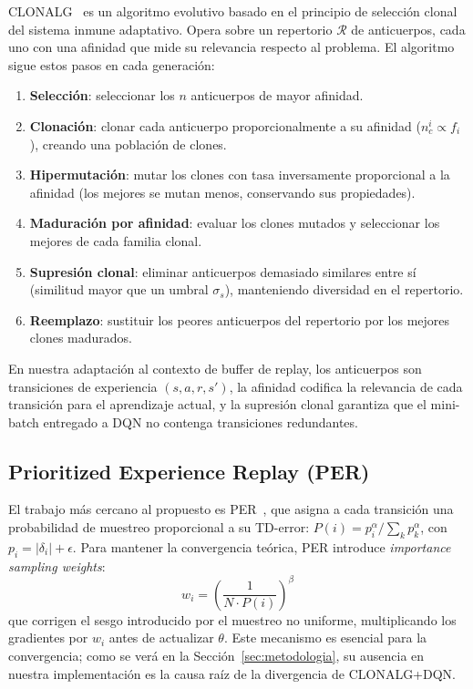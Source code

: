 \documentclass[12pt,a4paper]{article}
\begin{document}
CLONALG~\cite{decastro2002clonalg} es un algoritmo evolutivo basado en el
principio de selección clonal del sistema inmune adaptativo. Opera sobre un
repertorio $\mathcal{R}$ de anticuerpos, cada uno con una afinidad que mide
su relevancia respecto al problema. El algoritmo sigue estos pasos en cada
generación:
 
\begin{enumerate}[noitemsep]
  \item \textbf{Selección}: seleccionar los $n$ anticuerpos de mayor afinidad.
  \item \textbf{Clonación}: clonar cada anticuerpo proporcionalmente a su
        afinidad ($n_c^i \propto f_i$), creando una población de clones.
  \item \textbf{Hipermutación}: mutar los clones con tasa inversamente
        proporcional a la afinidad (los mejores se mutan menos, conservando
        sus propiedades).
  \item \textbf{Maduración por afinidad}: evaluar los clones mutados y
        seleccionar los mejores de cada familia clonal.
  \item \textbf{Supresión clonal}: eliminar anticuerpos demasiado similares
        entre sí (similitud mayor que un umbral $\sigma_s$), manteniendo
        diversidad en el repertorio.
  \item \textbf{Reemplazo}: sustituir los peores anticuerpos del repertorio
        por los mejores clones madurados.
\end{enumerate}
 
En nuestra adaptación al contexto de buffer de replay, los anticuerpos son
transiciones de experiencia $(s, a, r, s')$, la afinidad codifica la
relevancia de cada transición para el aprendizaje actual, y la supresión
clonal garantiza que el mini-batch entregado a DQN no contenga transiciones
redundantes.
 
\subsection{Prioritized Experience Replay (PER)}
 
El trabajo más cercano al propuesto es PER~\cite{schaul2015per}, que asigna
a cada transición una probabilidad de muestreo proporcional a su TD-error:
$P(i) = p_i^\alpha / \sum_k p_k^\alpha$, con $p_i = |\delta_i| + \epsilon$.
Para mantener la convergencia teórica, PER introduce
\textit{importance sampling weights}:
\begin{equation}
  w_i = \left(\frac{1}{N \cdot P(i)}\right)^\beta
  \label{eq:per_weights}
\end{equation}
que corrigen el sesgo introducido por el muestreo no uniforme,
multiplicando los gradientes por $w_i$ antes de actualizar $\theta$.
Este mecanismo es esencial para la convergencia; como se verá en la
Sección~\ref{sec:metodologia}, su ausencia en nuestra implementación es la
causa raíz de la divergencia de CLONALG+DQN.
 
\end{document}
